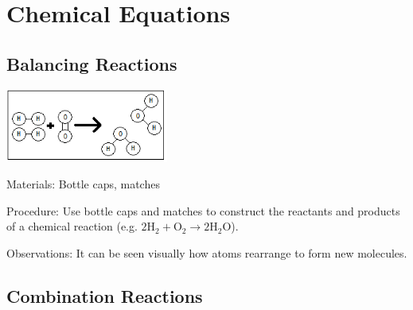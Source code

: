 \section{Chemical Equations}

\begin{multicols}{2}




\subsection{Balancing Reactions}

\begin{center}
\includegraphics[width=0.4\textwidth]{./img/balancing-reactions.png}
\end{center}

\begin{description*}
\item[Materials:]{Bottle caps, matches}
\item[Procedure:]{Use bottle caps and matches to construct the reactants and products of a chemical reaction (e.g. $2\mathrm{H}_2 + \mathrm{O}_2 \longrightarrow 2\mathrm{H}_2\mathrm{O}$). }
\item[Observations:]{It can be seen visually how atoms rearrange to form new molecules.}
\end{description*}

\subsection{Combination Reactions}



\end{multicols}
